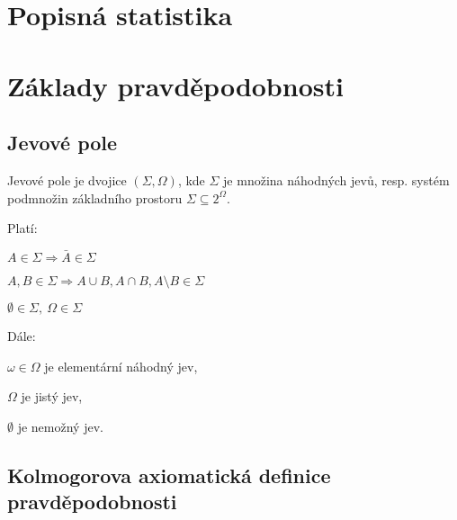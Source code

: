 
\section{Popisná statistika}



\section{Základy pravděpodobnosti}

\subsection{Jevové pole}

\begin{compactitem}
    \item Jevové pole je dvojice $(\Sigma, \Omega)$, kde $\Sigma$ je množina náhodných jevů, resp. systém podmnožin základního prostoru $\Sigma \subseteq 2^{\Omega}$.

    \item Platí: \begin{compactenum}
        \item $ A \in \Sigma \Rightarrow \bar{A} \in \Sigma $
        \item $ A, B \in \Sigma \Rightarrow A \cup B, A \cap B, A \setminus B \in \Sigma $
        \item $ \emptyset \in \Sigma,~ \Omega \in \Sigma $
    \end{compactenum}

    \item Dále: \begin{compactitem}
        \item $\omega \in \Omega$ je elementární náhodný jev,
        \item $\Omega$ je jistý jev,
        \item $\emptyset$ je nemožný jev.
    \end{compactitem}

\end{compactitem}

\subsection{Kolmogorova axiomatická definice pravděpodobnosti}

